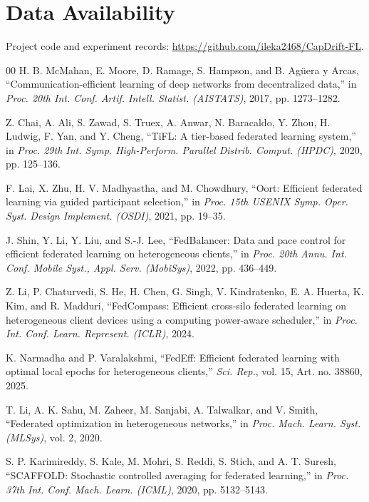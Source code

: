 \documentclass[conference]{IEEEtran}
\begin{document}
\section*{Data Availability}\label{sec:data}
Project code and experiment records: \url{https://github.com/ileka2468/CapDrift-FL}.

\balance
\begin{thebibliography}{00}
H. B. McMahan, E. Moore, D. Ramage, S. Hampson, and B. Ag\"uera y Arcas, ``Communication-efficient learning of deep networks from decentralized data,'' in \textit{Proc. 20th Int. Conf. Artif. Intell. Statist. (AISTATS)}, 2017, pp. 1273--1282.

Z. Chai, A. Ali, S. Zawad, S. Truex, A. Anwar, N. Baracaldo, Y. Zhou, H. Ludwig, F. Yan, and Y. Cheng, ``TiFL: A tier-based federated learning system,'' in \textit{Proc. 29th Int. Symp. High-Perform. Parallel Distrib. Comput. (HPDC)}, 2020, pp. 125--136.

F. Lai, X. Zhu, H. V. Madhyastha, and M. Chowdhury, ``Oort: Efficient federated learning via guided participant selection,'' in \textit{Proc. 15th USENIX Symp. Oper. Syst. Design Implement. (OSDI)}, 2021, pp. 19--35.

J. Shin, Y. Li, Y. Liu, and S.-J. Lee, ``FedBalancer: Data and pace control for efficient federated learning on heterogeneous clients,'' in \textit{Proc. 20th Annu. Int. Conf. Mobile Syst., Appl. Serv. (MobiSys)}, 2022, pp. 436--449.

Z. Li, P. Chaturvedi, S. He, H. Chen, G. Singh, V. Kindratenko, E. A. Huerta, K. Kim, and R. Madduri, ``FedCompass: Efficient cross-silo federated learning on heterogeneous client devices using a computing power-aware scheduler,'' in \textit{Proc. Int. Conf. Learn. Represent. (ICLR)}, 2024.

K. Narmadha and P. Varalakshmi, ``FedEff: Efficient federated learning with optimal local epochs for heterogeneous clients,'' \textit{Sci. Rep.}, vol. 15, Art. no. 38860, 2025.

T. Li, A. K. Sahu, M. Zaheer, M. Sanjabi, A. Talwalkar, and V. Smith, ``Federated optimization in heterogeneous networks,'' in \textit{Proc. Mach. Learn. Syst. (MLSys)}, vol. 2, 2020.

S. P. Karimireddy, S. Kale, M. Mohri, S. Reddi, S. Stich, and A. T. Suresh, ``SCAFFOLD: Stochastic controlled averaging for federated learning,'' in \textit{Proc. 37th Int. Conf. Mach. Learn. (ICML)}, 2020, pp. 5132--5143.


\end{thebibliography}
\end{document}
